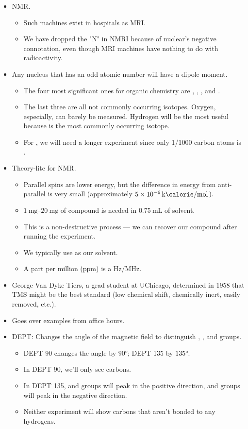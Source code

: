 \documentclass[../notes.tex]{subfiles}
\begin{document}
\begin{itemize}
    \item NMR.
    \begin{itemize}
        \item Such machines exist in hospitals as MRI.
        \item We have dropped the "N" in NMRI because of nuclear's negative connotation, even though MRI machines have nothing to do with radioactivity.
    \end{itemize}
    \item Any nucleus that has an odd atomic number will have a dipole moment.
    \begin{itemize}
        \item The four most significant ones for organic chemistry are , , , and .
        \item The last three are all not commonly occurring isotopes. Oxygen, especially, can barely be measured. Hydrogen will be the most useful because  is the most commonly occurring isotope.
        \item For , we will need a longer experiment since only 1/1000 carbon atoms is .
    \end{itemize}
    \item Theory-lite for NMR.
    \begin{itemize}
        \item Parallel spins are lower energy, but the difference in energy from anti-parallel is very small (approximately $\SI[per-mode=symbol]{5e-6}{\kilo\calorie\per\mole}$).
        \item $\SIrange{1}{20}{\milli\gram}$ of compound is needed in $\SI{0.75}{\milli\liter}$ of solvent.
        \item This is a non-destructive process --- we can recover our compound after running the experiment.
        \item We typically use  as our solvent.
        \item A part per million (ppm) is a Hz/MHz.
    \end{itemize}
    \item George Van Dyke Tiers, a grad student at UChicago, determined in 1958 that TMS might be the best standard (low chemical shift, chemically inert, easily removed, etc.).
    \item Goes over examples from office hours.
    \item DEPT: Changes the angle of the magnetic field to distinguish , , and  groups.
    \begin{itemize}
        \item DEPT 90 changes the angle by $\ang{90}$; DEPT 135 by $\ang{135}$.
        \item In DEPT 90, we'll only see  carbons.
        \item In DEPT 135,  and  groups will peak in the positive direction, and  groups will peak in the negative direction.
        \item Neither experiment will show carbons that aren't bonded to any hydrogens.
    \end{itemize}
\end{itemize}
\end{document}
